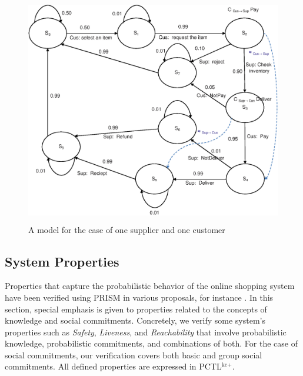 \begin{figure}%
                \begin{center}
                \includegraphics[width=14cm, height=10cm]{chap5/img/online-s-s.eps}
                \end{center}
                \caption{A model for the case of one supplier and one customer} \label{fig:Online-ss}
                \end{figure}



\subsection{System Properties}\label{sec:properties}

Properties that capture the probabilistic behavior of the online
shopping system have been verified using PRISM in various
proposals, for instance \cite{Ouchani2014}. In this section,
special emphasis is given to properties related to the concepts of
knowledge and social commitments. Concretely, we verify some
system's properties such as \textit{Safety}, \textit{Liveness}, and \textit{Reachability} that involve probabilistic
knowledge, probabilistic commitments, and combinations of both.
For the case of social commitments, our verification covers both
basic and group social commitments. All defined properties are
expressed in PCTL$^{\textrm{kc+}}$.

